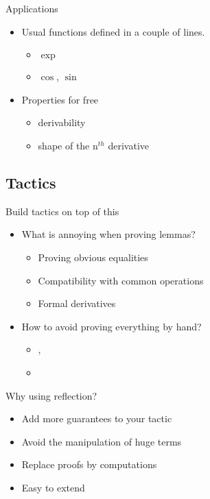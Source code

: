 \documentclass{beamer}
\begin{document}
\begin{frame}{Applications}
\begin{itemize}
 \item Usual functions defined in a couple of lines.
  \begin{itemize}
     \item $\exp$
     \item $\cos$, $\sin$
  \end{itemize}
 \item Properties for free
  \begin{itemize}
    \item derivability
    \item shape of the n$^{th}$ derivative
  \end{itemize}
\end{itemize}
\end{frame}

\subsection{Tactics}

\begin{frame}{Build tactics on top of this}
\begin{itemize}
  \item What is annoying when proving lemmas?
  \begin{itemize}
    \item Proving obvious equalities
    \item Compatibility with common operations
    \item Formal derivatives
  \end{itemize}
  \item How to avoid proving everything by hand?
  \begin{itemize}
    \item \ring{}, \field{}
    \item \solve{}
  \end{itemize}
\end{itemize}
\end{frame}

\begin{frame}{Why using reflection?}
\begin{itemize}
 \item Add more guarantees to your tactic
 \item Avoid the manipulation of huge terms
 \item Replace proofs by computations
 \item Easy to extend
\end{itemize}
\end{frame}
\end{document}

